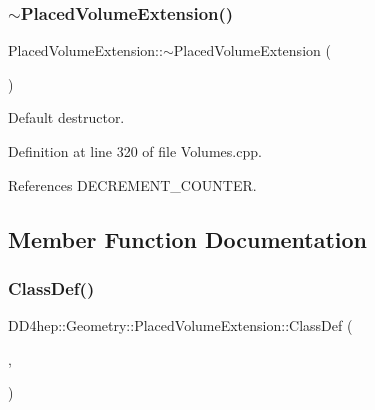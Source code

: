 \hypertarget{class_d_d4hep_1_1_geometry_1_1_placed_volume_extension_a99c666d418ebb75722ab794442169d72}{}\label{class_d_d4hep_1_1_geometry_1_1_placed_volume_extension_a99c666d418ebb75722ab794442169d72} 
\subsubsection{\texorpdfstring{$\sim$\+Placed\+Volume\+Extension()}{~PlacedVolumeExtension()}}
{\footnotesize\ttfamily Placed\+Volume\+Extension\+::$\sim$\+Placed\+Volume\+Extension (\begin{DoxyParamCaption}{ }\end{DoxyParamCaption})\hspace{0.3cm}{\ttfamily [virtual]}}



Default destructor. 



Definition at line 320 of file Volumes.\+cpp.



References D\+E\+C\+R\+E\+M\+E\+N\+T\+\_\+\+C\+O\+U\+N\+T\+ER.



\subsection{Member Function Documentation}
\hypertarget{class_d_d4hep_1_1_geometry_1_1_placed_volume_extension_a947783c6c9088c7569f0fdd90a330a39}{}\label{class_d_d4hep_1_1_geometry_1_1_placed_volume_extension_a947783c6c9088c7569f0fdd90a330a39} 
\subsubsection{\texorpdfstring{Class\+Def()}{ClassDef()}}
{\footnotesize\ttfamily D\+D4hep\+::\+Geometry\+::\+Placed\+Volume\+Extension\+::\+Class\+Def (\begin{DoxyParamCaption}\item[{\hyperlink{class_d_d4hep_1_1_geometry_1_1_placed_volume_extension}{Placed\+Volume\+Extension}}]{,  }\item[{1}]{ }\end{DoxyParamCaption})}



